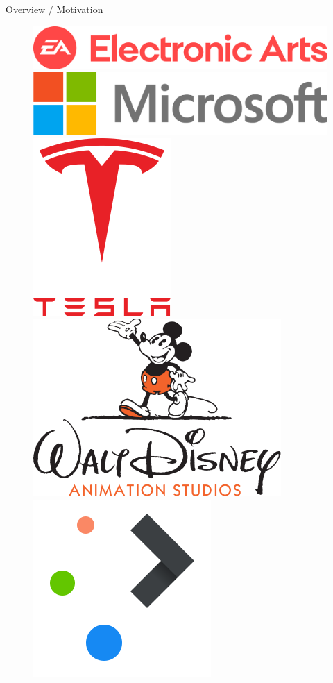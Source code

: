 \documentclass[11pt]{beamer}
\begin{document}
\begin{frame}{Overview / Motivation}
\begin{figure}
  \includegraphics[height=0.07\textheight]{assets/logo-electronic-arts}
  \includegraphics[height=0.07\textheight]{assets/logo-microsoft}
  \includegraphics[height=0.07\textheight]{assets/logo-tesla}
  \includegraphics[height=0.07\textheight]{assets/logo-walt-disney-animation-studios}
  \includegraphics[height=0.07\textheight]{assets/logo-kde}

\end{figure}
\end{frame}
\end{document}
